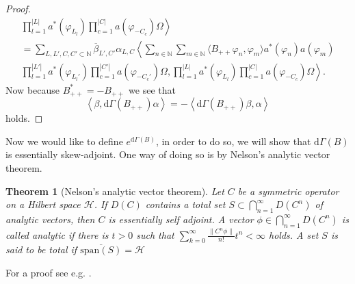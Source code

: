 \documentclass[b5paper,draft,openbib,12pt]{memoir}
\newtheorem{Thm}[Def]{Theorem}
\begin{document}
\begin{proof}
\begin{align}
\left.  \prod_{l=1}^{|L|}a^*(\varphi_{L_l})\prod_{c=1}^{|C|} a(\varphi_{-C_c})\Omega\right\rangle\\\nonumber
= \sum_{L,L',C,C'\subset \mathbb{N}} \overline{\beta}_{L',C'}\alpha_{L,C} 
\left\langle \sum_{n\in\mathbb{N}} \sum_{m\in\mathbb{N}} \langle B_{++}\varphi_n,\varphi_m\rangle a^*(\varphi_n) a(\varphi_{m})\right. \\ \nonumber
\left. \prod_{l=1}^{|L'|}a^*(\varphi_{L_l'})\prod_{c=1}^{|C'|} a(\varphi_{-C_c'})\Omega, \prod_{l=1}^{|L|}a^*(\varphi_{L_l})\prod_{c=1}^{|C|} a(\varphi_{-C_c})\Omega\right\rangle.
\end{align}
Now because \(B_{++}^*=-B_{++}\) we see that 
\begin{equation}
\left\langle \beta, \mathrm{d}\Gamma(B_{++})\alpha\right\rangle =- \left\langle \mathrm{d}\Gamma(B_{++})\beta, \alpha\right\rangle 
\end{equation}
holds.
\end{proof}



Now we would like to define \(e^{\mathrm{d}\Gamma(B)}\), in order to do so, we will show that \(\mathrm{d}\Gamma(B)\) is essentially skew-adjoint. 
One way of doing so is by Nelson's analytic vector theorem. 

\begin{Thm}[Nelson's analytic vector theorem]
Let \(C\) be a symmetric operator on a Hilbert space \(\mathscr{H}\). If \(D(C)\) contains a total set 
\(S\subset \bigcap_{n=1}^\infty D(C^n)\) of analytic vectors, then \(C\) is essentially self adjoint. 
A vector \(\phi\in \bigcap_{n=1}^\infty D(C^n)\) is called analytic if there is \(t>0\) such that
\(\sum_{k=0}^\infty \frac{\|C^n \phi\|}{n!} t^n<\infty\) holds. A set \(S\) is said to be total if \(\overline{\text{span}(S)}=\mathscr{H}\)
\end{Thm}
For a proof see e.g. \cite{SimonReed2}.
\end{document}
